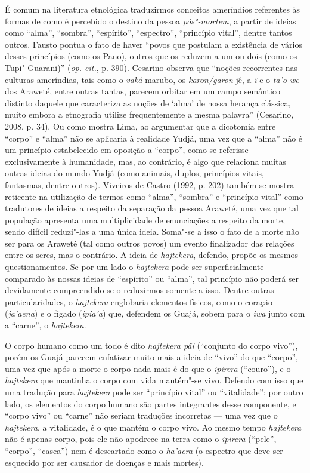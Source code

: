 É comum na literatura etnológica traduzirmos conceitos ameríndios
referentes às formas de como é percebido o destino da pessoa
\emph{pós"-mortem}, a partir de ideias como ``alma'', ``sombra'', ``espírito'',
``espectro'', ``princípio vital'', dentre tantos outros. Fausto pontua o
fato de haver ``povos que postulam a existência de vários desses
princípios (como os Pano), outros que os reduzem a um ou dois (como os
Tupi"-Guarani)'' (\emph{op. cit.}, p. 390). Cesarino observa que ``noções
recorrentes nas culturas ameríndias, tais como o \emph{vaká} marubo, os
\emph{karon/garon} jê, a \emph{ï} e o \emph{ta'o we} dos Araweté, entre
outras tantas, parecem orbitar em um campo semântico distinto daquele
que caracteriza as noções de `alma' de nossa herança clássica, muito
embora a etnografia utilize frequentemente a mesma palavra'' (Cesarino,
2008, p. 34). Ou como mostra Lima, ao argumentar que a dicotomia entre
``corpo'' e ``alma'' não se aplicaria à realidade Yudjá, uma vez que a
``alma'' não é um princípio estabelecido em oposição a ``corpo'', como se
referisse exclusivamente à humanidade, mas, ao contrário, é algo que
relaciona muitas outras ideias do mundo Yudjá (como animais, duplos,
princípios vitais, fantasmas, dentre outros). Viveiros de Castro (1992,
p. 202) também se mostra reticente na utilização de termos como ``alma'',
``sombra'' e ``princípio vital'' como tradutores de ideias a respeito da
separação da pessoa Araweté, uma vez que tal população apresenta uma
multiplicidade de enunciações a respeito da morte, sendo difícil
reduzi"-las a uma única ideia. Soma"-se a isso o fato de a morte não ser
para os Araweté (tal como outros povos) um evento finalizador das
relações entre os seres, mas o contrário. A ideia de \emph{hajtekera},
defendo, propõe os mesmos questionamentos. Se por um lado o
\emph{hajtekera} pode ser superficialmente comparado às nossas ideias de
``espírito'' ou ``alma'', tal princípio não poderá ser devidamente
compreendido se o reduzirmos somente a isso. Dentre outras
particularidades, o \emph{hajtekera} englobaria elementos físicos, como
o coração (\emph{ja'aena}) e o fígado (\emph{ipia'a}) que, defendem os
Guajá, sobem para o \emph{iwa} junto com a ``carne'', o \emph{hajtekera}.

O corpo humano como um todo é dito \emph{hajtekera pãi} (``conjunto do
corpo vivo''), porém os Guajá parecem enfatizar muito mais a ideia de
``vivo'' do que ``corpo'', uma vez que após a morte o corpo nada mais é do
que o \emph{ipirera} (``couro''), e o \emph{hajtekera} que mantinha o
corpo com vida mantém"-se vivo. Defendo com isso que uma tradução para
\emph{hajtekera} pode ser ``princípio vital'' ou ``vitalidade''; por outro
lado, os elementos do corpo humano são partes integrantes desse
componente, e ``corpo vivo'' ou ``carne'' não seriam traduções incorretas ---
uma vez que o \emph{hajtekera}, a vitalidade, é o que mantém o corpo
vivo. Ao mesmo tempo \emph{hajtekera} não é apenas corpo, pois ele não
apodrece na terra como o \emph{ipirera} (``pele'', ``corpo'', ``casca'') nem é
descartado como o \emph{ha'aera} (o espectro que deve ser esquecido por
ser causador de doenças e mais mortes).

